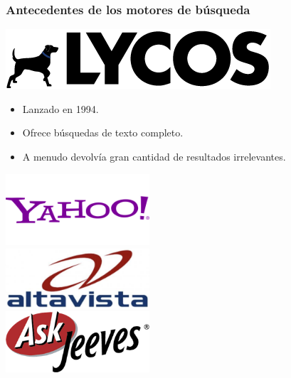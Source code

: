 \documentclass[
10pt, %
aspectratio=169, %
]{beamer}
\begin{document}
	\begin{frame}
		
		\frametitle{Antecedentes de los motores de búsqueda}
		
		\begin{minipage}[c]{0.6\textwidth}
			\includegraphics[width=\textwidth]{Lycos.png}
			
			\vspace{2\baselineskip}
			
			\begin{itemize}
				\item Lanzado en 1994.
				\item Ofrece búsquedas de texto completo.
				\item A menudo devolvía gran cantidad de resultados irrelevantes.
			\end{itemize}
			
		\end{minipage}%
		\hfill
		\begin{minipage}[c]{0.3\textwidth}
			\centering
			\includegraphics[width=0.4\textwidth]{yahoo.png}\\[1ex]
			\includegraphics[width=0.4\textwidth]{altavista.png}\\[1ex]
			\includegraphics[width=0.4\textwidth]{ask.png}
		\end{minipage}
		
	\end{frame}
	
\end{document}
